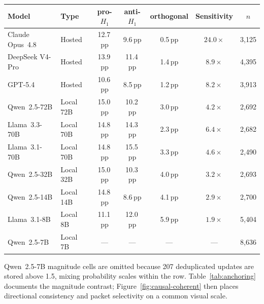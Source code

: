 \begin{center}
\begin{minipage}{\linewidth}
\centering
{}
\label{tab:anchoring}
\small
\begin{tabular}{llccccc}
\toprule
\textbf{Model} & \textbf{Type} & pro-$H_1$ & anti-$H_1$ & orthogonal
  & \textbf{Sensitivity} & $n$ \\
\midrule
Claude Opus~4.8 & Hosted  & 12.7\,pp & 9.6\,pp  & 0.5\,pp & $24.0\times$ & 3{,}125 \\
DeepSeek V4-Pro & Hosted  & 13.9\,pp & 11.4\,pp & 1.4\,pp & $8.9\times$  & 4{,}395 \\
GPT-5.4         & Hosted  & 10.6\,pp & 8.5\,pp  & 1.2\,pp & $8.2\times$  & 3{,}913 \\
\midrule
Qwen~2.5-72B    & Local 72B & 15.0\,pp & 10.2\,pp & 3.0\,pp & $4.2\times$  & 2{,}692 \\
Llama~3.3-70B   & Local 70B & 14.8\,pp & 14.3\,pp & 2.3\,pp & $6.4\times$  & 2{,}682 \\
Llama~3.1-70B   & Local 70B & 14.8\,pp & 15.5\,pp & 3.3\,pp & $4.6\times$  & 2{,}490 \\
Qwen~2.5-32B    & Local 32B & 15.0\,pp & 10.3\,pp & 4.0\,pp & $3.2\times$  & 2{,}693 \\
Qwen~2.5-14B    & Local 14B & 14.8\,pp &  8.6\,pp & 4.1\,pp & $2.9\times$  & 2{,}700 \\
Llama~3.1-8B    & Local 8B  & 11.1\,pp & 12.0\,pp & 5.9\,pp & $1.9\times$ & 5{,}404 \\
Qwen~2.5-7B     & Local 7B  & --- & --- & --- & --- & 8{,}636 \\
\bottomrule
\end{tabular}
\end{minipage}
\end{center}
Qwen~2.5-7B magnitude cells are omitted because 207 deduplicated updates are
stored above 1.5, mixing probability scales within the row.
Table~\ref{tab:anchoring} documents the magnitude contrast; Figure~\ref{fig:causal-coherent} then places directional consistency and packet selectivity on a common visual scale.

